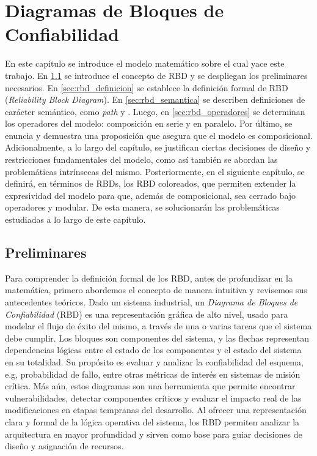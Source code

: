\chapter{Diagramas de Bloques de Confiabilidad}
\label{chapter:rbd}
En este capítulo se introduce el modelo matemático sobre el cual yace este trabajo. En \ref{sec:rbd_prelim} se introduce el concepto de RBD y se despliegan los preliminares necesarios.
En \ref{sec:rbd_definicion} se establece la definición formal de \gls{RBD} (\textit{Reliability Block Diagram}). 
En \ref{sec:rbd_semantica} se describen definiciones de carácter semántico, como \textit{path} y \cset. 
Luego, en \ref{sec:rbd_operadores} se determinan los operadores del modelo: composición en serie y en paralelo.
Por último, se enuncia y demuestra una proposición que asegura que el modelo es composicional. Adicionalmente,
a lo largo del capítulo, se justifican ciertas decisiones de diseño y restricciones fundamentales del modelo, como así también se abordan las problemáticas intrínsecas del mismo.
Posteriormente, en el siguiente capítulo, se definirá, en términos de RBDs, los RBD coloreados, que permiten extender la expresividad del modelo para que, además de composicional, sea cerrado bajo operadores y modular. De esta manera, se solucionarán las problemáticas estudiadas a lo largo de este capítulo.

\section{Preliminares}
\label{sec:rbd_prelim}
Para comprender la definición formal de los RBD, antes de profundizar en la matemática, primero abordemos el concepto de manera intuitiva y revisemos sus antecedentes teóricos.
Dado un sistema industrial, un \textit{Diagrama de Bloques de Confiabilidad} (RBD) es una representación gráfica de alto nivel, usado para modelar el flujo de éxito del mismo, a través de una o varias tareas que el sistema debe cumplir.
Los bloques son componentes del sistema, y las flechas representan dependencias lógicas entre el estado de los componentes y el estado del sistema en su totalidad.
Su propósito es evaluar y analizar la confiabilidad del esquema, e.g, probabilidad de fallo, entre otras métricas de interés en sistemas de misión crítica. Más aún, estos diagramas son una herramienta que permite encontrar vulnerabilidades, detectar componentes críticos y evaluar el impacto real de las modificaciones en etapas tempranas del desarrollo. Al ofrecer una representación clara y formal de la lógica operativa del sistema, los RBD permiten analizar la arquitectura en mayor profundidad y sirven como base para guiar decisiones de diseño y asignación de recursos.

